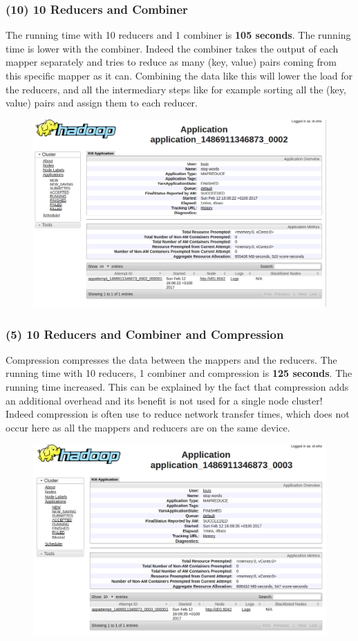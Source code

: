 \documentclass[a4paper,12pt]{article}
\begin{document}
\subsubsection{(10) 10 Reducers and Combiner}
The running time with 10 reducers and 1 combiner is \textbf{105 seconds}.
The running time is lower with the combiner. Indeed the combiner takes the output
of each mapper separately and tries to reduce as many (key, value) pairs coming
from this specific mapper as it can.
Combining the data like this will lower the load for the reducers, and all the
intermediary steps like for example sorting all the (key, value) pairs and assign them
to each reducer.
\begin{figure}[!htbp]
  \centering
  \includegraphics[width=.6\textwidth]{stopwords_10_reducers_1_combiner.png}
\end{figure}
\subsubsection{(5) 10 Reducers and Combiner and Compression}
Compression compresses the data between the mappers and the reducers.
The running time with 10 reducers, 1 combiner and compression is \textbf{125 seconds}.
The running time increased. This can be explained by the fact that compression adds
an additional overhead and its benefit is not used for a single node cluster!
Indeed compression is often use to reduce network transfer times, which does not
occur here as all the mappers and reducers are on the same device.
\begin{figure}[!htbp]
  \centering
  \includegraphics[width=.6\textwidth]{stopwords_10_reducers_1_combiner_compression.png}
\end{figure}
\end{document}

